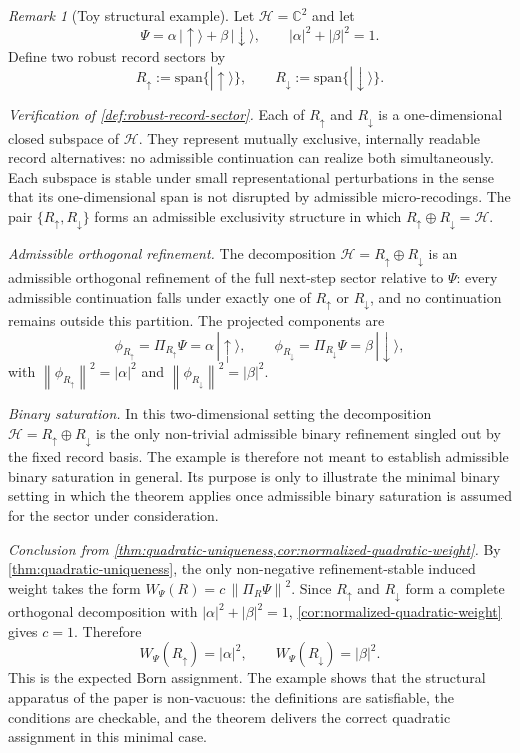 \documentclass[11pt]{article}
\theoremstyle{remark}
\newtheorem{remark}{Remark}
\numberwithin{equation}{section}
\newcommand{\HH}{\mathcal{H}}
\newcommand{\Wpsi}[1]{W_{\Psi}\!\left(#1\right)}
\newcommand{\Proj}[1]{\Pi_{#1}}
\newcommand{\norm}[1]{\left\lVert #1 \right\rVert}
\begin{document}
\begin{remark}[Toy structural example]
\label{rem:spin-example}
Let $\HH = \mathbb{C}^2$ and let
\[
  \Psi = \alpha\,|\uparrow\rangle + \beta\,|\downarrow\rangle,
  \qquad
  |\alpha|^2 + |\beta|^2 = 1.
\]
Define two robust record sectors by
\[
  R_\uparrow := \mathrm{span}\{|\uparrow\rangle\},
  \qquad
  R_\downarrow := \mathrm{span}\{|\downarrow\rangle\}.
\]

\emph{Verification of \cref{def:robust-record-sector}.}
Each of $R_\uparrow$ and $R_\downarrow$ is a one-dimensional closed
subspace of $\HH$. They represent mutually exclusive, internally
readable record alternatives: no admissible continuation can realize
both simultaneously. Each subspace is stable under small
representational perturbations in the sense that its one-dimensional
span is not disrupted by admissible micro-recodings. The pair
$\{R_\uparrow, R_\downarrow\}$ forms an admissible exclusivity
structure in which $R_\uparrow \oplus R_\downarrow = \HH$.

\emph{Admissible orthogonal refinement.}
The decomposition $\HH = R_\uparrow \oplus R_\downarrow$ is an
admissible orthogonal refinement of the full next-step sector relative
to $\Psi$: every admissible continuation falls under exactly one of
$R_\uparrow$ or $R_\downarrow$, and no continuation remains outside
this partition. The projected components are
\[
  \phi_{R_\uparrow} = \Proj{R_\uparrow}\Psi = \alpha\,|\uparrow\rangle,
  \qquad
  \phi_{R_\downarrow} = \Proj{R_\downarrow}\Psi = \beta\,|\downarrow\rangle,
\]
with $\norm{\phi_{R_\uparrow}}^2 = |\alpha|^2$ and
$\norm{\phi_{R_\downarrow}}^2 = |\beta|^2$.

\emph{Binary saturation.}
In this two-dimensional setting the decomposition
$\HH = R_\uparrow \oplus R_\downarrow$ is the only non-trivial
admissible binary refinement singled out by the fixed record basis.
The example is therefore not meant to establish admissible binary
saturation in general. Its purpose is only to illustrate the minimal
binary setting in which the theorem applies once admissible binary
saturation is assumed for the sector under consideration.

\emph{Conclusion from \cref{thm:quadratic-uniqueness,cor:normalized-quadratic-weight}.}
By \cref{thm:quadratic-uniqueness}, the only non-negative
refinement-stable induced weight takes the form
$\Wpsi{R} = c\,\norm{\Proj{R}\Psi}^2$.
Since $R_\uparrow$ and $R_\downarrow$ form a complete orthogonal
decomposition with $|\alpha|^2 + |\beta|^2 = 1$,
\cref{cor:normalized-quadratic-weight} gives $c = 1$. Therefore
\[
  \Wpsi{R_\uparrow} = |\alpha|^2,
  \qquad
  \Wpsi{R_\downarrow} = |\beta|^2.
\]
This is the expected Born assignment. The example shows that the
structural apparatus of the paper is non-vacuous: the definitions are
satisfiable, the conditions are checkable, and the theorem delivers
the correct quadratic assignment in this minimal case.
\end{remark}
\end{document}
